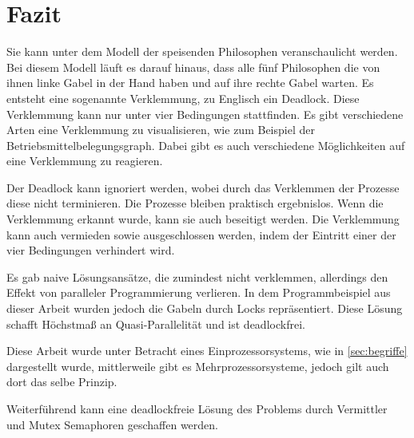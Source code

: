 \chapter{Fazit}
\label{fazit}

Sie kann unter dem Modell der speisenden Philosophen veranschaulicht werden. Bei diesem Modell läuft es darauf hinaus, dass alle fünf Philosophen die von ihnen linke Gabel in der Hand haben und auf ihre rechte Gabel warten. Es entsteht eine sogenannte Verklemmung, zu Englisch ein Deadlock. Diese Verklemmung kann nur unter vier Bedingungen stattfinden. Es gibt verschiedene Arten eine Verklemmung zu visualisieren, wie zum Beispiel der Betriebsmittelbelegungsgraph. Dabei gibt es auch verschiedene Möglichkeiten auf eine Verklemmung zu reagieren. 

Der Deadlock kann ignoriert werden, wobei durch das Verklemmen der Prozesse diese nicht terminieren. Die Prozesse bleiben praktisch ergebnislos. 
Wenn die Verklemmung erkannt wurde, kann sie auch beseitigt werden.
Die Verklemmung kann auch vermieden sowie ausgeschlossen werden, indem der Eintritt einer der vier Bedingungen verhindert wird.

Es gab naive Lösungsansätze, die zumindest nicht verklemmen, allerdings den Effekt von paralleler Programmierung verlieren. 
In dem Programmbeispiel aus dieser Arbeit wurden jedoch die Gabeln durch Locks repräsentiert. Diese Lösung schafft Höchstmaß an Quasi-Parallelität und ist deadlockfrei. 

Diese Arbeit wurde unter Betracht eines Einprozessorsystems, wie in \ref{sec:begriffe}  dargestellt wurde, mittlerweile gibt es Mehrprozessorsysteme, jedoch gilt auch dort das selbe Prinzip.

Weiterführend kann eine deadlockfreie Lösung des Problems durch Vermittler und Mutex Semaphoren geschaffen werden. 